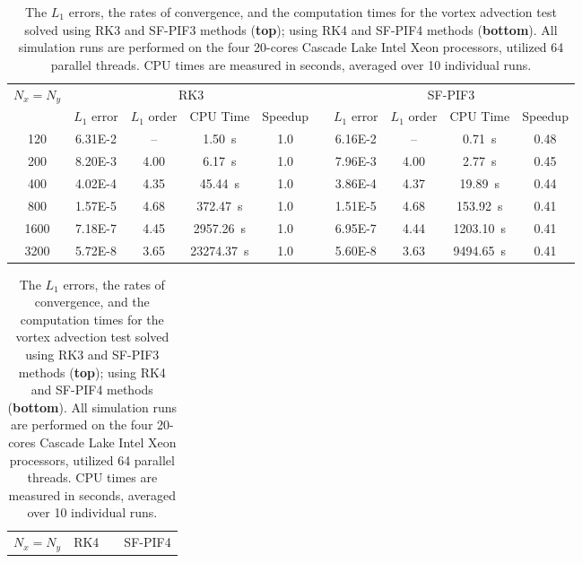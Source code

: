 \begin{table}
    \centering
    \caption{The \( L_{1} \) errors, the rates of convergence,
        and the computation times for the vortex advection test
        solved using RK3 and SF-PIF3 methods (\textbf{top});
        using RK4 and SF-PIF4 methods (\textbf{bottom}).
        All simulation runs are performed on the four 20-cores
        Cascade Lake Intel Xeon processors, utilized 64 parallel threads.
        CPU times are measured in seconds, averaged over 10 individual runs.
    }\label{table:vortex_weno_fourth}
    \begin{adjustbox}{width=\textwidth}
        \begin{tabular}{@{}ccccclcccc@{}}
            \toprule
            \multirow{2}{*}{\( N_{x} = N_{y} \)} & \multicolumn{4}{c}{RK3} &  & \multicolumn{4}{c}{SF-PIF3} \\
            \cmidrule(lr){2-5} \cmidrule(l){7-10}
            & \(L_{1}\) error & \(L_{1}\) order & CPU Time & Speedup &  &
            \(L_{1}\) error & \(L_{1}\) order & CPU Time & Speedup \\ \midrule
            120  & \num{6.31E-2} & \--- & \SI{1.50}{\second}      & 1.0 &  & \num{6.16E-2} & \--- & \SI{0.71}{\second}    & 0.48 \\
            200  & \num{8.20E-3} & 4.00 & \SI{6.17}{\second}      & 1.0 &  & \num{7.96E-3} & 4.00 & \SI{2.77}{\second}    & 0.45 \\
            400  & \num{4.02E-4} & 4.35 & \SI{45.44}{\second}     & 1.0 &  & \num{3.86E-4} & 4.37 & \SI{19.89}{\second}   & 0.44 \\
            800  & \num{1.57E-5} & 4.68 & \SI{372.47}{\second}    & 1.0 &  & \num{1.51E-5} & 4.68 & \SI{153.92}{\second}  & 0.41 \\
            1600 & \num{7.18E-7} & 4.45 & \SI{2957.26}{\second}   & 1.0 &  & \num{6.95E-7} & 4.44 & \SI{1203.10}{\second} & 0.41 \\
            3200 & \num{5.72E-8} & 3.65 & \SI{23274.37}{\second}  & 1.0 &  & \num{5.60E-8} & 3.63 & \SI{9494.65}{\second} & 0.41 \\
        \end{tabular}
    \end{adjustbox}
    \begin{adjustbox}{width=\textwidth}
        \begin{tabular}{@{}ccccclcccc@{}}
            \toprule
            \multirow{2}{*}{\( N_{x} = N_{y} \)} & \multicolumn{4}{c}{RK4} &  & \multicolumn{4}{c}{SF-PIF4} \\

\end{tabular}
\end{adjustbox}
\end{table}
